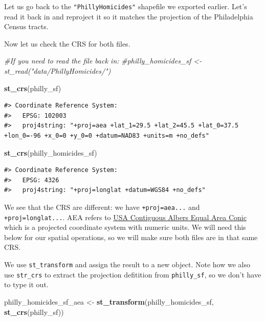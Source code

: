 \documentclass[]{book}
\newenvironment{Shaded}{\begin{snugshade}}{\end{snugshade}}
\newcommand{\KeywordTok}[1]{\textcolor[rgb]{0.13,0.29,0.53}{\textbf{#1}}}
\newcommand{\StringTok}[1]{\textcolor[rgb]{0.31,0.60,0.02}{#1}}
\newcommand{\CommentTok}[1]{\textcolor[rgb]{0.56,0.35,0.01}{\textit{#1}}}
\newcommand{\NormalTok}[1]{#1}
\begin{document}
Let us go back to the \texttt{"PhillyHomicides"} shapefile we exported
earlier. Let's read it back in and reproject it so it matches the
projection of the Philadelphia Census tracts.

Now let us check the CRS for both files.

\begin{Shaded}
\begin{Highlighting}[]
\CommentTok{#If you need to read the file back in:}
\CommentTok{#philly_homicides_sf <- st_read("data/PhillyHomicides/")}

\KeywordTok{st_crs}\NormalTok{(philly_sf)}
\end{Highlighting}
\end{Shaded}

\begin{verbatim}
#> Coordinate Reference System:
#>   EPSG: 102003 
#>   proj4string: "+proj=aea +lat_1=29.5 +lat_2=45.5 +lat_0=37.5 +lon_0=-96 +x_0=0 +y_0=0 +datum=NAD83 +units=m +no_defs"
\end{verbatim}

\begin{Shaded}
\begin{Highlighting}[]
\KeywordTok{st_crs}\NormalTok{(philly_homicides_sf)}
\end{Highlighting}
\end{Shaded}

\begin{verbatim}
#> Coordinate Reference System:
#>   EPSG: 4326 
#>   proj4string: "+proj=longlat +datum=WGS84 +no_defs"
\end{verbatim}

We see that the CRS are different: we have \texttt{+proj=aea...} and
\texttt{+proj=longlat...}. AEA refers to
\href{http://spatialreference.org/ref/esri/102003/}{USA Contiguous
Albers Equal Area Conic} which is a projected coordinate system with
numeric units. We will need this below for our spatial operations, so we
will make sure both files are in that same CRS.

We use \texttt{st\_transform} and assign the result to a new object.
Note how we also use \texttt{str\_crs} to extract the projection
defitition from \texttt{philly\_sf}, so we don't have to type it out.

\begin{Shaded}
\begin{Highlighting}[]
\NormalTok{philly_homicides_sf_aea <-}\StringTok{ }\KeywordTok{st_transform}\NormalTok{(philly_homicides_sf, }\KeywordTok{st_crs}\NormalTok{(philly_sf))}
\end{Highlighting}
\end{Shaded}
\end{document}
